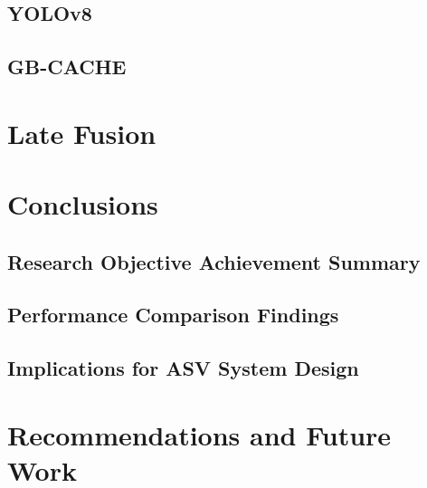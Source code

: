 \documentclass{erauthesis}
\begin{document}
    \section{YOLOv8} \label{yolo}

    \section{GB-CACHE} \label{gbcache}

\chapter{Late Fusion}

\chapter{Conclusions}


\section{Research Objective Achievement Summary}

\section{Performance Comparison Findings}

\section{Implications for ASV System Design}

\chapter{Recommendations and Future Work}

\end{document}

